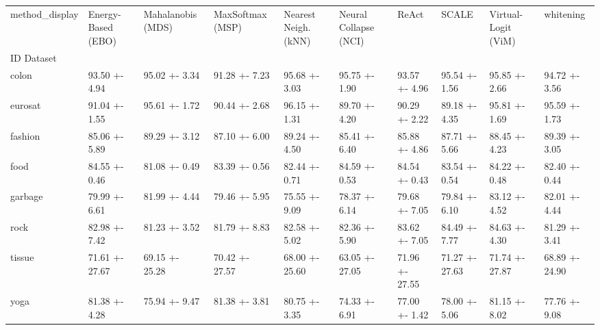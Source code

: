 \begin{tabular}{llllllllll}
\toprule
method_display & Energy-Based (EBO) & Mahalanobis (MDS) & MaxSoftmax (MSP) & Nearest Neigh. (kNN) & Neural Collapse (NCI) & ReAct & SCALE & Virtual-Logit (ViM) & whitening \\
ID Dataset &  &  &  &  &  &  &  &  &  \\
\midrule
colon & 93.50 +- 4.94 & 95.02 +- 3.34 & 91.28 +- 7.23 & 95.68 +- 3.03 & 95.75 +- 1.90 & 93.57 +- 4.96 & 95.54 +- 1.56 & 95.85 +- 2.66 & 94.72 +- 3.56 \\
eurosat & 91.04 +- 1.55 & 95.61 +- 1.72 & 90.44 +- 2.68 & 96.15 +- 1.31 & 89.70 +- 4.20 & 90.29 +- 2.22 & 89.18 +- 4.35 & 95.81 +- 1.69 & 95.59 +- 1.73 \\
fashion & 85.06 +- 5.89 & 89.29 +- 3.12 & 87.10 +- 6.00 & 89.24 +- 4.50 & 85.41 +- 6.40 & 85.88 +- 4.86 & 87.71 +- 5.66 & 88.45 +- 4.23 & 89.39 +- 3.05 \\
food & 84.55 +- 0.46 & 81.08 +- 0.49 & 83.39 +- 0.56 & 82.44 +- 0.71 & 84.59 +- 0.53 & 84.54 +- 0.43 & 83.54 +- 0.54 & 84.22 +- 0.48 & 82.40 +- 0.44 \\
garbage & 79.99 +- 6.61 & 81.99 +- 4.44 & 79.46 +- 5.95 & 75.55 +- 9.09 & 78.37 +- 6.14 & 79.68 +- 7.05 & 79.84 +- 6.10 & 83.12 +- 4.52 & 82.01 +- 4.44 \\
rock & 82.98 +- 7.42 & 81.23 +- 3.52 & 81.79 +- 8.83 & 82.58 +- 5.02 & 82.36 +- 5.90 & 83.62 +- 7.05 & 84.49 +- 7.77 & 84.63 +- 4.30 & 81.29 +- 3.41 \\
tissue & 71.61 +- 27.67 & 69.15 +- 25.28 & 70.42 +- 27.57 & 68.00 +- 25.60 & 63.05 +- 27.05 & 71.96 +- 27.55 & 71.27 +- 27.63 & 71.74 +- 27.87 & 68.89 +- 24.90 \\
yoga & 81.38 +- 4.28 & 75.94 +- 9.47 & 81.38 +- 3.81 & 80.75 +- 3.35 & 74.33 +- 6.91 & 77.00 +- 1.42 & 78.00 +- 5.06 & 81.15 +- 8.02 & 77.76 +- 9.08 \\
\bottomrule
\end{tabular}
